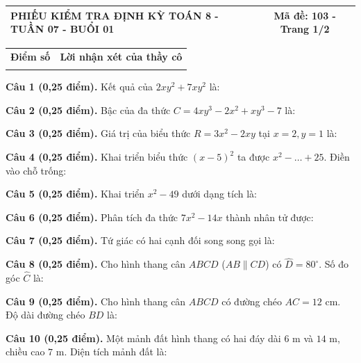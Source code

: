 \documentclass[12pt,a4paper]{article}
\begin{document}
\newpage
\noindent
\begin{tabularx}{\linewidth}{|X|c|}
\hline
\textbf{PHIẾU KIỂM TRA ĐỊNH KỲ TOÁN 8 - TUẦN 07 - BUỔI 01} & \textbf{Mã đề: 103 - Trang 1/2} \\
\hline
\end{tabularx}

\vspace{1.2mm}

\noindent
\begin{tabularx}{\linewidth}{|p{3.2cm}|X|}
\hline
\centering\textbf{Điểm số} & \centering\textbf{Lời nhận xét của thầy cô} \tabularnewline
\rule{0pt}{1.8cm} & \\
\hline
\end{tabularx}

\vspace{1.2mm}

\noindent\textbf{Câu 1 (0,25 điểm).} Kết quả của $2x y^2 + 7x y^2$ là: \par\vspace{0.3mm}
\noindent\textbf{Câu 2 (0,25 điểm).} Bậc của đa thức $C = 4x y^3 - 2x^2 + x y^3 - 7$ là: \par\vspace{0.3mm}
\noindent\textbf{Câu 3 (0,25 điểm).} Giá trị của biểu thức $R = 3x^2 - 2xy$ tại $x = 2, y = 1$ là: \par\vspace{0.3mm}
\noindent\textbf{Câu 4 (0,25 điểm).} Khai triển biểu thức $(x - 5)^2$ ta được $x^2 - \ldots + 25$. Điền vào chỗ trống: \par\vspace{0.3mm}
\noindent\textbf{Câu 5 (0,25 điểm).} Khai triển $x^2 - 49$ dưới dạng tích là: \par\vspace{0.3mm}
\noindent\textbf{Câu 6 (0,25 điểm).} Phân tích đa thức $7x^2 - 14x$ thành nhân tử được: \par\vspace{0.3mm}
\noindent\textbf{Câu 7 (0,25 điểm).} Tứ giác có hai cạnh đối song song gọi là: \par\vspace{0.3mm}
\noindent\textbf{Câu 8 (0,25 điểm).} Cho hình thang cân $ABCD$ ($AB \parallel CD$) có $\widehat{D} = 80^\circ$. Số đo góc $\widehat{C}$ là: \par\vspace{0.3mm}
\noindent\textbf{Câu 9 (0,25 điểm).} Cho hình thang cân $ABCD$ có đường chéo $AC = 12\text{ cm}$. Độ dài đường chéo $BD$ là: \par\vspace{0.3mm}
\noindent\textbf{Câu 10 (0,25 điểm).} Một mảnh đất hình thang có hai đáy dài $6\text{ m}$ và $14\text{ m}$, chiều cao $7\text{ m}$. Diện tích mảnh đất là: \par\vspace{0.3mm}
\end{document}
